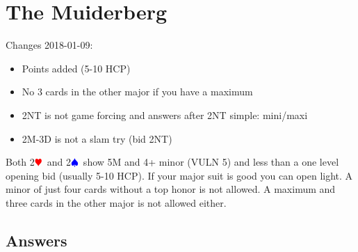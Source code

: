 \documentclass[a4paper]{article}
\newcommand{\BH}{\textcolor{Red}{$\varheartsuit${}}}
\newcommand{\BS}{\textcolor{Blue}{$\spadesuit${}}}
\begin{document}
\section{The Muiderberg}

Changes 2018-01-09:
\bigbreak
\begin{itemize}
\item Points added (5-10 HCP)

\item No 3 cards in the other major if you have a maximum

\item 2NT is not game forcing and answers after 2NT simple: mini/maxi

\item 2M-3D is not a slam try (bid 2NT)

\end{itemize}
\bigbreak
Both 2\BH\ and 2\BS\ show 5M and 4+ minor (VULN 5) and less than a one level opening
bid (usually 5-10 HCP). If your major suit is good you can open light. A minor of just four cards
without a top honor is not allowed. A maximum and three cards in the other
major is not allowed either.
\bigbreak
\subsection{Answers}
\end{document}
